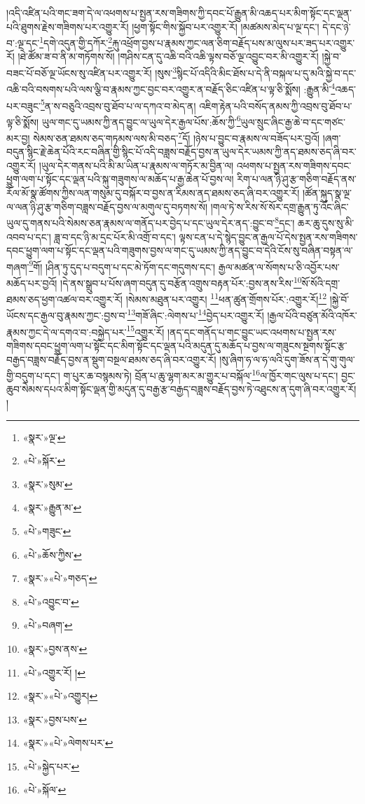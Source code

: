 །འདི་འཛིན་པའི་གང་ཟག་དེ་ལ་འཕགས་པ་སྤྱན་རས་གཟིགས་ཀྱི་དབང་པོ་རྒྱུན་མི་འཆད་པར་མིག་སྟོང་དང་ལྡན་པའི་ཐུགས་རྗེས་གཟིགས་པར་འགྱུར་རོ། །ཕྱག་སྟོང་གིས་སྐྱོབ་པར་འགྱུར་རོ། །མཚམས་མེད་པ་ལྔ་དང་། དེ་དང་ཉེ་བ་:ལྔ་དང་\footnote{«སྣར་»ལྔ་}དགེ་འདུན་གྱི་དཀོར་\footnote{«པེ་»སྐོར་}རྐུ་འཕྲོག་བྱས་པ་རྣམས་ཀྱང་ལན་ཅིག་བརྗོད་པས་མ་ལུས་པར་ཟད་པར་འགྱུར་རོ། །ཐེ་ཚོམ་ཟ་བ་ནི་མ་གཏོགས་སོ། །གཤིས་ངན་དུ་འཆི་བའི་འཆི་ལྟས་བཅོ་ལྔ་འབྱུང་བར་མི་འགྱུར་རོ། །སྐྱེ་བ་བཟང་པོ་བཅོ་ལྔ་ཡོངས་སུ་འཛིན་པར་འགྱུར་རོ། །སུས་\footnote{«སྣར་»སུམ་}སྙིང་པོ་འདིའི་མིང་ཐོས་པ་དེ་ནི་བསྐལ་པ་དུ་མའི་སྐྱེ་བ་དང་འཆི་བའི་བསགས་པའི་ལས་ལྕི་བ་རྣམས་ཀྱང་བྱང་བར་འགྱུར་ན་བརྗོད་ཅིང་འཛིན་པ་ལྟ་ཅི་སྨོས། :རྒྱུན་མི་\footnote{«སྣར་»རྒྱུན་མ་}འཆད་པར་བཟུང་\footnote{«པེ་»གཟུང་}ན་ས་བཅུའི་འབྲས་བུ་ཐོབ་པ་ལ་དཀའ་བ་མེད་ན། འཇིག་རྟེན་པའི་བསོད་ནམས་ཀྱི་འབྲས་བུ་ཐོབ་པ་ལྟ་ཅི་སྨོས། ཡུལ་གང་དུ་ཡམས་ཀྱི་ནད་བྱུང་ལ་ཡུལ་དེར་རྒྱལ་པོས་:ཆོས་ཀྱི་\footnote{«པེ་»ཆོས་ཀྱིས་}ཡུལ་སྲུང་ཞིང་རྒྱ་ཆེ་བ་དང་གཙང་མར་བྱ། སེམས་ཅན་ཐམས་ཅད་གཏམས་ལས་མི་བཅད་\footnote{«སྣར་»«པེ་»གཅད་}དོ། །ཉེས་པ་བྱུང་བ་རྣམས་ལ་བཟོད་པར་བྱའོ། །ཞག་བདུན་སྙིང་རྗེ་ཆེན་པོའི་རང་བཞིན་གྱི་སྙིང་པོ་འདི་བཟླས་བརྗོད་བྱས་ན་ཡུལ་དེར་ཡམས་ཀྱི་ནད་ཐམས་ཅད་ཞི་བར་འགྱུར་རོ། །ཡུལ་དེར་གནས་པའི་མི་མ་ཡིན་པ་རྣམས་ལ་གཏོར་མ་བྱིན་ལ། འཕགས་པ་སྤྱན་རས་གཟིགས་དབང་ཕྱུག་ལག་པ་སྟོང་དང་ལྡན་པའི་སྐུ་གཟུགས་ལ་མཆོད་པ་རྒྱ་ཆེན་པོ་བྱས་ལ། རིག་པ་ལན་ཉི་ཤུ་རྩ་གཅིག་བརྗོད་ནས་རོལ་མོ་སྣ་ཚོགས་ཀྱིས་ལན་གསུམ་དུ་བསྐོར་བ་བྱས་ན་རིམས་ནད་ཐམས་ཅད་ཞི་བར་འགྱུར་རོ། །ཚོན་སྐུད་སྣ་ལྔ་ལ་ལན་ཉི་ཤུ་རྩ་གཅིག་བཟླས་བརྗོད་བྱས་ལ་མགུལ་དུ་བཏགས་སོ། །གལ་ཏེ་ས་རིས་སོ་སོར་དགྲ་རྒྱུན་ཏུ་འོང་ཞིང་ཡུལ་དུ་གནས་པའི་སེམས་ཅན་རྣམས་ལ་གནོད་པར་བྱེད་པ་དང་ཡུལ་དེར་ནད་:བྱུང་བ་\footnote{«པེ་»འབྱུང་བ་}དང་། ཆར་ཆུ་དུས་སུ་མི་འབབ་པ་དང་། ཟླ་བ་དང་ཉི་མ་དྲང་པོར་མི་འགྲོ་བ་དང་། ལྟས་ངན་པ་དེ་སྙེད་བྱུང་ན་རྒྱལ་པོ་དེས་སྤྱན་རས་གཟིགས་དབང་ཕྱུག་ལག་པ་སྟོང་དང་ལྡན་པའི་གཟུགས་བྱས་ལ་གང་དུ་ཡམས་ཀྱི་ནད་བྱུང་བ་དེའི་ངོས་སུ་བཞིན་བསྟན་ལ་གཞག་\footnote{«པེ་»བཞག་}གོ། །ཤིན་ཏུ་དུད་པ་བདུག་པ་དང་མེ་ཏོག་དང་གདུགས་དང་། རྒྱལ་མཚན་ལ་སོགས་པ་ཅི་འབྱོར་པས་མཆོད་པར་བྱའོ། །དེ་ནས་སྒྲུབ་པ་པོས་ཞག་བདུན་དུ་བརྩོན་འགྲུས་བརྟན་པོར་:བྱས་ནས་རིས་\footnote{«སྣར་»བྱས་ནས་}སོ་སོའི་དགྲ་ཐམས་ཅད་ཕྱག་འཚལ་བར་འགྱུར་རོ། །སེམས་མཐུན་པར་འགྱུར། \footnote{«པེ་»འགྱུར་རོ། ། }ཕན་ཚུན་གྲོགས་པོར་:འགྱུར་རོ།\footnote{«སྣར་»«པེ་»འགྱུར།} །སྐྱེ་བོ་ཡོངས་དང་རྒྱལ་བུ་རྣམས་ཀྱང་:བྱས་བ་\footnote{«སྣར་»བྱས་པས་}གཟོ་ཞིང་:ལེགས་པ་\footnote{«སྣར་»«པེ་»ལེགས་པར་}བྱེད་པར་འགྱུར་རོ། །རྒྱལ་པོའི་བཙུན་མོའི་འཁོར་རྣམས་ཀྱང་དེ་ལ་དགའ་བ་:བསྐྱེད་པར་\footnote{«པེ་»སྐྱེད་པར་}འགྱུར་རོ། །ནད་དང་གནོད་པ་གང་བྱུང་ཡང་འཕགས་པ་སྤྱན་རས་གཟིགས་དབང་ཕྱུག་ལག་པ་སྟོང་དང་མིག་སྟོང་དང་ལྡན་པའི་མདུན་དུ་མཆོད་པ་བྱས་ལ་གཟུངས་སྔགས་སྟོང་རྩ་བརྒྱད་བཟླས་བརྗོད་བྱས་ན་སྡུག་བསྔལ་ཐམས་ཅད་ཞི་བར་འགྱུར་རོ། །སུ་ཞིག་ཧ་ལ་ཧ་ལའི་དུག་ཟོས་ན་དེ་གུ་གུལ་གྱི་བདུག་པ་དང་། ག་པུར་ཆ་བསྙམས་ཏེ། བྲོན་པ་ཆུ་ལྷག་མར་མ་གྱུར་པ་བསྐོལ་\footnote{«པེ་»སྐོལ་}ལ་ཁྱོར་གང་ལུས་པ་དང་། བྱང་ཆུབ་སེམས་དཔའ་མིག་སྟོང་ལྡན་གྱི་མདུན་དུ་བརྒྱ་རྩ་བརྒྱད་བཟླས་བརྗོད་བྱས་ཏེ་འཐུངས་ན་དུག་ཞི་བར་འགྱུར་རོ། །
